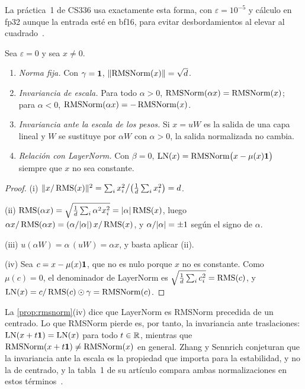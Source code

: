 La práctica~1 de CS336 usa exactamente esta forma, con $\varepsilon=10^{-5}$ y cálculo en fp32 aunque la entrada esté en bf16, para evitar desbordamientos al elevar al cuadrado~\cite[§3.4.1]{cs336a1}.

\begin{proposicion}\label{prop:rmsnorm}
Sea $\varepsilon=0$ y sea $x\ne 0$.
\begin{enumerate}
  \item \emph{Norma fija.} Con $\gamma=\mathbf{1}$, $\lVert\operatorname{RMSNorm}(x)\rVert=\sqrt d$.
  \item \emph{Invariancia de escala.} Para todo $\alpha>0$, $\operatorname{RMSNorm}(\alpha x)=\operatorname{RMSNorm}(x)$; para $\alpha<0$, $\operatorname{RMSNorm}(\alpha x)=-\operatorname{RMSNorm}(x)$.
  \item \emph{Invariancia ante la escala de los pesos.} Si $x=uW$ es la salida de una capa lineal y $W$ se sustituye por $\alpha W$ con $\alpha>0$, la salida normalizada no cambia.
  \item \emph{Relación con LayerNorm.} Con $\beta=0$, $\operatorname{LN}(x)=\operatorname{RMSNorm}\bigl(x-\mu(x)\mathbf{1}\bigr)$ siempre que $x$ no sea constante.
\end{enumerate}
\end{proposicion}

\begin{proof}
(i) $\lVert x/\operatorname{RMS}(x)\rVert^{2}=\sum_i x_i^{2}\big/\bigl(\frac1d\sum_i x_i^{2}\bigr)=d$.

(ii) $\operatorname{RMS}(\alpha x)=\sqrt{\frac1d\sum_i\alpha^{2}x_i^{2}}=\lvert\alpha\rvert\operatorname{RMS}(x)$, luego $\alpha x/\operatorname{RMS}(\alpha x)=(\alpha/\lvert\alpha\rvert)\,x/\operatorname{RMS}(x)$, y $\alpha/\lvert\alpha\rvert=\pm1$ según el signo de $\alpha$.

(iii) $u(\alpha W)=\alpha\,(uW)=\alpha x$, y basta aplicar (ii).

(iv) Sea $c=x-\mu(x)\mathbf{1}$, que no es nulo porque $x$ no es constante. Como $\mu(c)=0$, el denominador de LayerNorm es $\sqrt{\frac1d\sum_i c_i^{2}}=\operatorname{RMS}(c)$, y $\operatorname{LN}(x)=c/\operatorname{RMS}(c)\odot\gamma=\operatorname{RMSNorm}(c)$.
\end{proof}

La \cref{prop:rmsnorm}(iv) dice que LayerNorm es RMSNorm precedida de un centrado. Lo que RMSNorm pierde es, por tanto, la invariancia ante traslaciones: $\operatorname{LN}(x+t\mathbf{1})=\operatorname{LN}(x)$ para todo $t\in\mathbb{R}$, mientras que $\operatorname{RMSNorm}(x+t\mathbf{1})\ne\operatorname{RMSNorm}(x)$ en general. Zhang y Sennrich conjeturan que la invariancia ante la escala es la propiedad que importa para la estabilidad, y no la de centrado, y la tabla~1 de su artículo compara ambas normalizaciones en estos términos~\cite[§4.1]{rmsnorm}.

